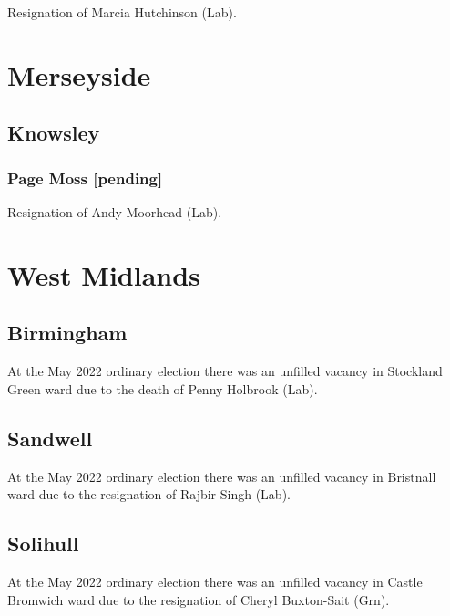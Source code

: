 \documentclass[a4paper,openany]{book}
\begin{document}
\begin{resultsiii}

Resignation of Marcia Hutchinson (Lab).

\section{Merseyside}

\subsection*{Knowsley}

\subsubsection*{Page Moss \hspace*{\fill}\nolinebreak[1]%
	\enspace\hspace*{\fill}
	[pending]}


Resignation of Andy Moorhead (Lab).

\section{West Midlands}

\subsection*{Birmingham}

At the May 2022 ordinary election there was an unfilled vacancy in Stockland Green ward due to the death of Penny Holbrook (Lab).%

\subsection*{Sandwell}

At the May 2022 ordinary election there was an unfilled vacancy in Bristnall ward due to the resignation of Rajbir Singh (Lab).%

\subsection*{Solihull}

At the May 2022 ordinary election there was an unfilled vacancy in Castle Bromwich ward due to the resignation of Cheryl Buxton-Sait (Grn).%


\end{resultsiii}
\end{document}
